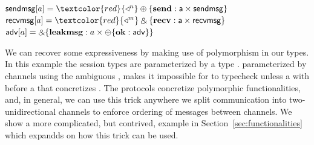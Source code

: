 %
%
\begin{center}
\parbox{0cm}{
\begin{tabbing}
$\m{sendmsg}[a] = \textcolor{red}{\getpot^n} \ichoice{\mb{send}: \m{a} \product \m{sendmsg}}$ \\
$\m{recvmsg}[a] = \textcolor{red}{\getpot^m} \echoice{\mb{recv}: \m{a} \product \m{recvmsg}}$ \\
$\mathsf{adv}[a] = \mathbin{\binampersand} \{ \mathbf{leakmsg}: a \times \oplus \{  \mathbf{ok}: \mathsf{adv} \} \}$
\end{tabbing}}
\end{center}
We can recover some expressiveness by making use of polymorphism in our types. In this example the session types are parameterized by a type . 
\Fauth parameterized by channels using the ambiguous , makes it impossible for \Fauth to typecheck unless a  with before a  that concretizes .
The protocols concretize polymorphic functionalities, and, in general, we can use this trick anywhere we split communication into two-unidirectional channels to enforce ordering of messages between channels. 
We show a more complicated, but contrived, example in Section~\ref{sec:functionalities} which expandds on how this trick can be used. 

